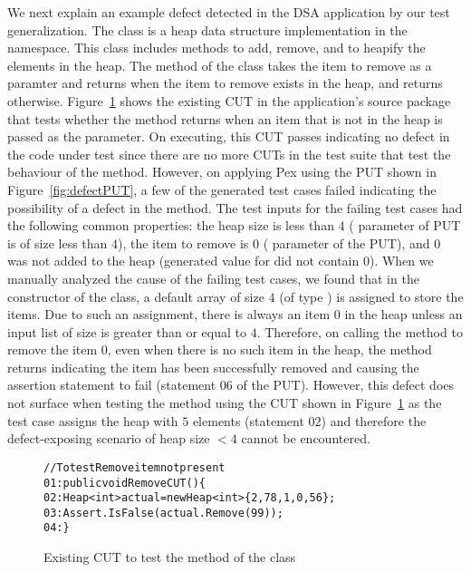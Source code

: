 We next explain an example defect detected in the DSA application by our test generalization. The class  is a heap data structure implementation in the  namespace. This class includes methods to add, remove, and to heapify the elements in the heap. The  method of the class takes the item to remove as a paramter and returns  when the item to remove exists in the heap, and returns  otherwise. Figure~\ref{fig:defectCUT} shows the existing CUT in the application's source package that tests whether the  method returns  when an item that is not in the heap is passed as the parameter. On executing, this CUT passes indicating no defect in the code under test since there are no more CUTs in the test suite that test the behaviour of the method. However, on applying Pex using the PUT shown in Figure~\ref{fig:defectPUT}, a few of the generated test cases failed indicating the possibility of a defect in the  method. The test inputs for the failing test cases had the following common properties: the heap size is less than $4$ ( parameter of PUT is of size less than $4$), the item to remove is $0$ ( parameter of the PUT), and $0$ was not added to the heap (generated value for  did not contain $0$). When we manually analyzed the cause of the failing test cases, we found that in the constructor of the  class, a default array of size $4$ (of type ) is assigned to store the items. Due to such an assignment, there is always an item $0$ in the heap unless an input list of size is greater than or equal to $4$. Therefore, on calling the  method to remove the item $0$, even when there is no such item in the heap, the method returns  indicating the item has been successfully removed and causing the assertion statement to fail (statement $06$ of the PUT). However, this defect does not surface when testing the method using the CUT shown in Figure~\ref{fig:defectCUT} as the test case assigns the heap with $5$ elements (statement $02$) and therefore the defect-exposing scenario of heap size $< 4$ cannot be encountered. 

\begin{figure}[t]
\begin{CodeOut}
\begin{alltt}
//To test Remove item not present
01: public void RemoveCUT()\{
02: \hspace*{0.07in}Heap<int> actual = new Heap<int> \{2, 78, 1, 0, 56\};
03: \hspace*{0.07in}Assert.IsFalse(actual.Remove(99));
04: \hspace*{0.02in}\}
\end{alltt}
\end{CodeOut}
\caption{Existing CUT to test the  method of the  class}
\label{fig:defectCUT}
\end{figure}

